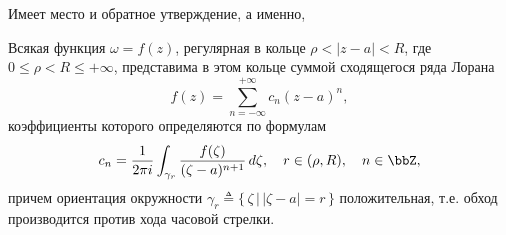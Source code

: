 Имеет место и обратное утверждение, а именно, 

\begin{thm} \label{ch35.1Thm1}
Всякая функция $\omega = f(z)$, регулярная в кольце $\rho < |z - a| < R$, где $0 \le \rho < R \le +\infty$, представима в этом кольце суммой сходящегося ряда Лорана
$$
f(z) = \sum\limits_{n = -\infty}^{+\infty} c_n(z - a)^n,
$$
коэффициенты которого определяются по формулам
\begin{equation} \label{ch35.1eq4}
c_n = \frac{1}{2\pi i} \int_{\gamma_r} \frac{f(\zeta)}{(\zeta - a)^{n + 1}} \,d\zeta, \quad r \in (\rho, R), \quad n \in \bbZ,
\end{equation}
причем ориентация окружности $\gamma_r \triangleq \{\,\zeta \,\big|\, |\zeta - a| = r\,\}$ положительная, т.е. обход производится против хода часовой стрелки.

\end{thm}

